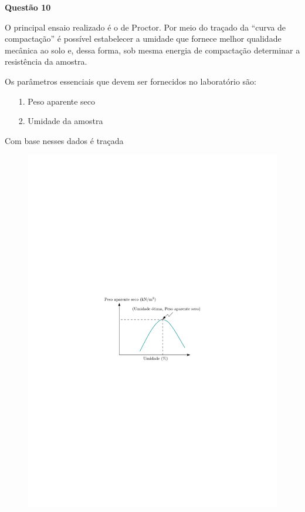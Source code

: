\item[]\textbf{Questão 10}

\hspace{1cm}O principal ensaio realizado é o de Proctor. Por meio do traçado da ``curva de compactação'' é possível estabelecer a umidade que fornece melhor qualidade mecânica ao solo e, dessa forma, sob mesma energia de compactação determinar a resistência da amostra. 

Os parâmetros essenciais que devem ser fornecidos no laboratório são:

\begin{enumerate}
	\item[1.] Peso aparente seco
	\item[2.] Umidade da amostra
\end{enumerate}

Com base nesses dados é traçada 

\begin{figure}[h!]
	\centering
	\includegraphics[scale=1.2]{images/proctor}
\end{figure}